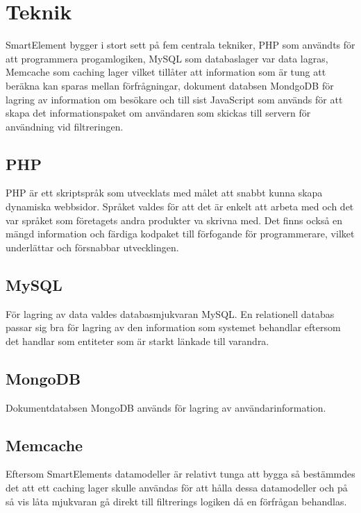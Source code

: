 \section{Teknik}

SmartElement bygger i stort sett på fem centrala tekniker, PHP som användts för att programmera progamlogiken, MySQL som databaslager var data lagras, Memcache som caching lager vilket tillåter att information som är tung att beräkna kan sparas mellan förfrågningar, dokument databsen MondgoDB för lagring av information om besökare och till sist JavaScript som används för att skapa det informationspaket om användaren som skickas till servern för användning vid filtreringen.

\subsection{PHP}

PHP är ett skriptspråk som utvecklats med målet att snabbt kunna skapa dynamiska webbsidor. \citep{phpmanual} Språket valdes för att det är enkelt att arbeta med och det var språket som företagets andra produkter va skrivna med. Det finns också en mängd information och färdiga kodpaket till förfogande för programmerare, vilket underlättar och försnabbar utvecklingen.

\subsection{MySQL}

För lagring av data valdes databasmjukvaran MySQL. En relationell databas passar sig bra för lagring av den information som systemet behandlar eftersom det handlar som entiteter som är starkt länkade till varandra.

\subsection{MongoDB}

Dokumentdatabsen MongoDB används för lagring av användarinformation.

\subsection{Memcache}

Eftersom SmartElements datamodeller är relativt tunga att bygga så bestämmdes det att ett caching lager skulle användas för att hålla dessa datamodeller och på så vis låta mjukvaran gå direkt till filtrerings logiken då en förfrågan behandlas.

